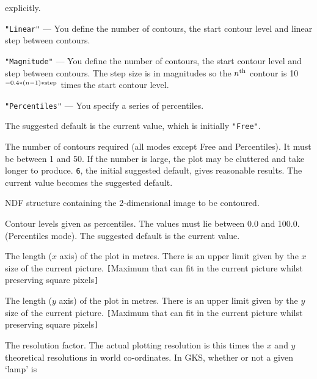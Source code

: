 \documentclass[twoside,11pt]{article}
\newcommand{\sstsubsection}[1]{ \item[{#1}] \mbox{} \\}
\renewcommand{\sstsubsection}[1]{\item[{#1}]}
\begin{document}
{{{\begin{description}
                        explicitly.
         \item {\tt "Linear"} --- You define the number of contours, the start
                        contour level and linear step between contours.
         \item {\tt "Magnitude"} --- You define the number of contours, the start
                        contour level and step between contours.  The
                        step size is in magnitudes so the $n^{\rm th}$
                        contour is 10$^{-0.4*(n-1)*{\rm step}}$ times the
                        start contour level.
         \item {\tt "Percentiles"} --- You specify a series of percentiles.
         \end{description}

         The suggested default is the current value, which is initially
         {\tt "Free"}.
      }
      \sstsubsection{
         NCONT = \_INTEGER (Read)
      }{
         The number of contours required (all modes except Free and
         Percentiles).  It must be between 1 and 50.  If the number is
         large, the plot may be cluttered and take longer to produce.
         {\tt 6}, the initial suggested default, gives reasonable results.
         The current value becomes the suggested default.
      }
      \sstsubsection{
         NDF = NDF (Read)
      }{
         NDF structure containing the 2-dimensional image to be contoured.
      }
      \sstsubsection{
         PERCENTILES() = \_REAL (Read)
      }{
         Contour levels given as percentiles.  The values must lie
         between 0.0 and 100.0. (Percentiles mode).  The suggested
         default is the current value.
      }
      \sstsubsection{
         PXSIZE = \_REAL (Read)
      }{
         The length ($x$ axis) of the plot in metres.  There is an upper
         limit given by the $x$ size of the current picture.
         {\tt [}Maximum that can fit in the current picture whilst
         preserving square pixels{\tt ]}
      }
      \sstsubsection{
         PYSIZE = \_REAL (Read)
      }{
         The length ($y$ axis) of the plot in metres.  There is an upper
         limit given by the $y$ size of the current picture.
         {\tt [}Maximum that can fit in the current picture whilst
         preserving square pixels{\tt ]}
      }
      \sstsubsection{
         RESOLUTION = \_REAL (Read)
      }{
         The resolution factor. The actual plotting resolution is this
         times the $x$ and $y$ theoretical resolutions in world
         co-ordinates.  In GKS, whether or not a given `lamp' is
}}}
\end{document}

